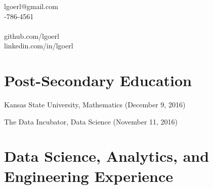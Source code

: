 \documentclass[a4paper,10pt,notitlepage]{article}
\begin{document}
\begin{multicols}{2}{
\noindent %

\noindent lgoerl@gmail.com\\
-786-4561\\
\\
\hspace*{-10pt}\hfill github.com/lgoerl\\
\hspace*{-10pt}\hfill linkedin.com/in/lgoerl\\
}
\end{multicols}
\vspace{-20pt}\section*{Post-Secondary Education}
    \begin{description}
    \vspace{-5pt} \item[PhD:] Kansas State University, Mathematics (December 9, 2016)
    \item[Professional Training:] The Data Incubator, Data Science (November 11, 2016)
    \end{description}

\section*{Data Science, Analytics, and Engineering Experience}
\end{document}
